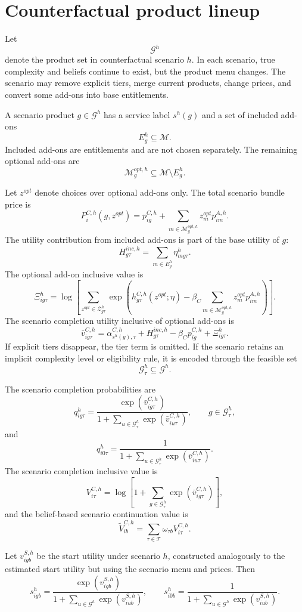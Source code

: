 \documentclass[11pt]{article}
\newcommand{\G}{\mathcal{G}}
\newcommand{\Tset}{\mathcal{T}}
\newcommand{\Zset}{\mathcal{Z}}
\newcommand{\Mset}{\mathcal{M}}
\begin{document}
\section{Counterfactual product lineup}


Let
\[
\G^h
\]
denote the product set in counterfactual scenario $h$. In each scenario, true complexity and beliefs continue to exist, but the product menu changes. The scenario may remove explicit tiers, merge current products, change prices, and convert some add-ons into base entitlements.

A scenario product $g\in\G^h$ has a service label $s^h(g)$ and a set of included add-ons
\[
E_g^h\subseteq\Mset.
\]
Included add-ons are entitlements and are not chosen separately. The remaining optional add-ons are
\[
\Mset_g^{opt,h}\subseteq\Mset\setminus E_g^h.
\]

Let $z^{opt}$ denote choices over optional add-ons only. The total scenario bundle price is
\[
P_i^{C,h}(g,z^{opt})
=
p_{ig}^{C,h}+
\sum_{m\in\Mset_g^{opt,h}}z_m^{opt}p_{im}^{A,h}.
\]
The utility contribution from included add-ons is part of the base utility of $g$:
\[
H_{g\tau}^{inc,h}=\sum_{m\in E_g^h}\eta_{mg\tau}^{h}.
\]
The optional add-on inclusive value is
\[
\Xi_{ig\tau}^{h}
=
\log\left[
\sum_{z^{opt}\in\Zset_{g\tau}^{h}}
\exp\left(
 h_{g\tau}^{C,h}(z^{opt};\eta)
 -\beta_C\sum_{m\in\Mset_g^{opt,h}}z_m^{opt}p_{im}^{A,h}
\right)
\right].
\]
The scenario completion utility inclusive of optional add-ons is
\[
\bar v_{ig\tau}^{C,h}
=
\alpha_{s^h(g),\tau}^{C,h}
+H_{g\tau}^{inc,h}
-\beta_C p_{ig}^{C,h}
+\Xi_{ig\tau}^{h}.
\]
If explicit tiers disappear, the tier term is omitted. If the scenario retains an implicit complexity level or eligibility rule, it is encoded through the feasible set
\[
\G_\tau^h\subseteq\G^h.
\]

The scenario completion probabilities are
\[
q_{ig\tau}^{h}
=
\frac{\exp(\bar v_{ig\tau}^{C,h})}
{1+\sum_{u\in\G_\tau^h}\exp(\bar v_{iu\tau}^{C,h})},
\qquad g\in\G_\tau^h,
\]
and
\[
q_{i0\tau}^{h}
=
\frac{1}{1+\sum_{u\in\G_\tau^h}\exp(\bar v_{iu\tau}^{C,h})}.
\]
The scenario completion inclusive value is
\[
V_{i\tau}^{C,h}=\log\left[1+\sum_{g\in\G_\tau^h}\exp(\bar v_{ig\tau}^{C,h})\right],
\]
and the belief-based scenario continuation value is
\[
\widetilde V_{ib}^{C,h}=\sum_{\tau\in\Tset}\omega_{\tau b}V_{i\tau}^{C,h}.
\]

Let $v_{igb}^{S,h}$ be the start utility under scenario $h$, constructed analogously to the estimated start utility but using the scenario menu and prices. Then
\[
s_{igb}^{h}
=
\frac{\exp(v_{igb}^{S,h})}
{1+\sum_{u\in\G^h}\exp(v_{iub}^{S,h})},
\qquad
s_{i0b}^{h}
=
\frac{1}{1+\sum_{u\in\G^h}\exp(v_{iub}^{S,h})}.
\]
\end{document}
